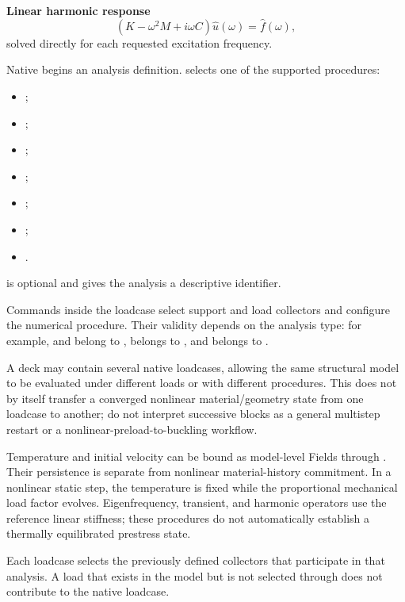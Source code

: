 \textbf{Linear harmonic response}
\[
\left(K-\omega^2M+i\omega C\right)\hat u(\omega)=\hat f(\omega),
\]
solved directly for each requested excitation frequency.


Native  begins an analysis definition.  selects one of the supported procedures:
\begin{itemize}
  \item {};
  \item {};
  \item {};
  \item {};
  \item {};
  \item {};
  \item {}.
\end{itemize}
 is optional and gives the analysis a descriptive identifier.

Commands inside the loadcase select support and load collectors and configure the numerical procedure. Their validity depends on the analysis type: for example,  and  belong to ,  belongs to , and  belongs to .

A deck may contain several native loadcases, allowing the same structural model to be evaluated under different loads or with different procedures. This does not by itself transfer a converged nonlinear material/geometry state from one loadcase to another; do not interpret successive  blocks as a general multistep restart or a nonlinear-preload-to-buckling workflow.

Temperature and initial velocity can be bound as model-level Fields through . Their persistence is separate from nonlinear material-history commitment. In a nonlinear static step, the temperature is fixed while the proportional mechanical load factor evolves. Eigenfrequency, transient, and harmonic operators use the reference linear stiffness; these procedures do not automatically establish a thermally equilibrated prestress state.

Each loadcase selects the previously defined collectors that participate in that analysis. A load that exists in the model but is not selected through  does not contribute to the native loadcase.

